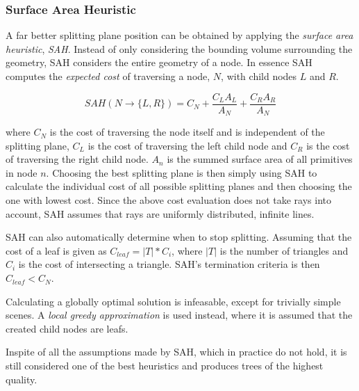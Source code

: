 \subsubsection{Surface Area Heuristic}


A far better splitting plane position can be obtained by applying the
\textit{surface area heuristic}, \textit{SAH}. Instead of only
considering the bounding volume surrounding the geometry, SAH
considers the entire geometry of a node. In essence SAH computes the
\textit{expected cost} of traversing a node, $N$, with child nodes $L$
and $R$.

\begin{displaymath}
  SAH(N \rightarrow \{L, R\}) = C_N + \frac{C_L A_L}{A_N} +
  \frac{C_R A_R}{A_N}
\end{displaymath}

where $C_N$ is the cost of traversing the node itself and is
independent of the splitting plane, $C_L$ is the cost of traversing
the left child node and $C_R$ is the cost of traversing the right
child node. $A_n$ is the summed surface area of all primitives in node
$n$. Choosing the best splitting plane is then simply using SAH to
calculate the individual cost of all possible splitting planes and
then choosing the one with lowest cost. Since the above cost
evaluation does not take rays into account, SAH assumes that rays are
uniformly distributed, infinite lines.

SAH can also automatically determine when to stop splitting. Assuming
that the cost of a leaf is given as $C_{leaf} = |T| * C_i$, where
$|T|$ is the number of triangles and $C_i$ is the cost of intersecting
a triangle. SAH's termination criteria is then $C_{leaf} < C_N$.


Calculating a globally optimal solution is infeasable, except for
trivially simple scenes. A \textit{local greedy approximation} is used
instead, where it is assumed that the created child nodes are
leafs.

Inspite of all the assumptions made by SAH, which in practice do not
hold, it is still considered one of the best heuristics and produces
trees of the highest quality.



